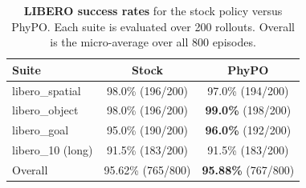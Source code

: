 \documentclass{article}
\begin{document}
\begin{table}[t]
\centering
\small
\setlength{\tabcolsep}{6pt}
\caption{\textbf{LIBERO success rates} for the stock policy versus PhyPO.
Each suite is evaluated over 200 rollouts. Overall is the micro-average over all 800 episodes.}
\label{tab:libero-success}
\begin{tabular}{lcc}
\toprule
Suite & Stock & PhyPO \\
\midrule
libero\_spatial     & 98.0\% (196/200) & 97.0\% (194/200) \\
libero\_object      & 98.0\% (196/200) & \textbf{99.0\%} (198/200) \\
libero\_goal        & 95.0\% (190/200) & \textbf{96.0\%} (192/200) \\
libero\_10 (long)   & 91.5\% (183/200) & 91.5\% (183/200) \\
\midrule
Overall             & 95.62\% (765/800) & \textbf{95.88\%} (767/800) \\
\bottomrule
\end{tabular}
\end{table}
\end{document}
